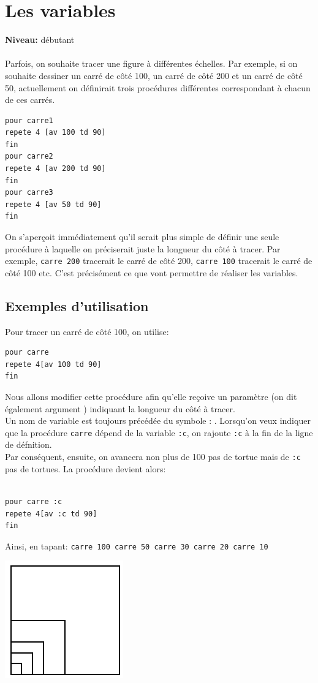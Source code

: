 \chapter{Les variables}
{ }\hfill\textbf{Niveau:} débutant\\ \\
\noindent \noindent Parfois, on souhaite tracer une figure à différentes échelles. Par exemple, si on souhaite dessiner un carré de côté 100, un carré de côté 200 et un carré de côté 50, actuellement on définirait trois procédures différentes correspondant à chacun de ces carrés. 
\begin{verbatim}
pour carre1
repete 4 [av 100 td 90]
fin
pour carre2
repete 4 [av 200 td 90]
fin
pour carre3
repete 4 [av 50 td 90]
fin
\end{verbatim}
On s'aperçoit immédiatement qu'il serait plus simple de définir une seule procédure à laquelle on préciserait juste la longueur du côté à tracer. Par exemple, \texttt{carre 200} tracerait le carré de côté 200, \texttt{carre 100} tracerait le carré de côté 100 etc. C'est précisément ce que vont permettre de réaliser les variables.
\section{Exemples d'utilisation}
\noindent Pour tracer un carré de côté 100, on utilise:
\begin{verbatim}
pour carre
repete 4[av 100 td 90]
fin
\end{verbatim}
Nous allons modifier cette procédure afin qu'elle reçoive un paramètre (on dit également \og argument \fg) indiquant la longueur du côté à tracer. \\
Un nom de variable est toujours précédée du symbole \og : \fg. Lorsqu'on veux indiquer que la procédure \texttt{carre} dépend de la variable \texttt{:c}, on rajoute \texttt{:c} à la fin de la ligne de défnition. \\
Par conséquent, ensuite, on avancera non plus de 100 pas de tortue mais de \texttt{:c} pas de tortues. La procédure devient alors:
\begin{verbatim}

pour carre :c
repete 4[av :c td 90]
fin
\end{verbatim}
Ainsi, en tapant: \texttt{carre 100 carre 50 carre 30 carre 20 carre 10}\\
 \begin{center}
\includegraphics[scale=0.5]{images/variables-carres.png}
\end{center}
 \vspace{1cm}
